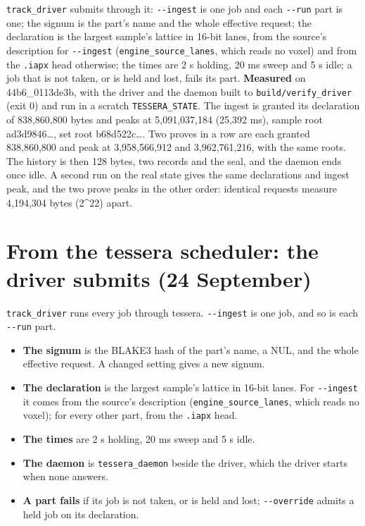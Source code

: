 \texttt{track\_\allowbreak{}driver} submits through it: \texttt{-\allowbreak{}-\allowbreak{}ingest} is one job and each \texttt{-\allowbreak{}-\allowbreak{}run} part is one; the signum is the part's name and the whole effective request; the declaration is the largest sample's lattice in 16-bit lanes, from the source's description for \texttt{-\allowbreak{}-\allowbreak{}ingest} (\texttt{engine\_\allowbreak{}source\_\allowbreak{}lanes}, which reads no voxel) and from the \texttt{.\allowbreak{}iapx} head otherwise; the times are 2 s holding, 20 ms sweep and 5 s idle; a job that is not taken, or is held and lost, fails its part. \textbf{Measured} on 44b6\_\allowbreak{}0113de3b, with the driver and the daemon built to \texttt{build/\allowbreak{}verify\_\allowbreak{}driver} (exit 0) and run in a scratch \texttt{TESSERA\_\allowbreak{}STATE}. The ingest is granted its declaration of 838,860,800 bytes and peaks at 5,091,037,184 (25,392 ms), sample root ad3d9846…, set root b68d522c…. Two proves in a row are each granted 838,860,800 and peak at 3,958,566,912 and 3,962,761,216, with the same roots. The history is then 128 bytes, two records and the seal, and the daemon ends once idle. A second run on the real state gives the same declarations and ingest peak, and the two prove peaks in the other order: identical requests measure 4,194,304 bytes (2\textasciicircum{}22) apart.

\section{\texorpdfstring{From the tessera scheduler: the driver submits (24 September)}{From the tessera scheduler: the driver submits (24 September)}}

\texttt{track\_\allowbreak{}driver} runs every job through tessera. \texttt{-\allowbreak{}-\allowbreak{}ingest} is one job, and so is each \texttt{-\allowbreak{}-\allowbreak{}run} part.

\begin{itemize}
\item \textbf{The signum} is the BLAKE3 hash of the part's name, a NUL, and the whole effective request. A changed setting gives a new signum.
\item \textbf{The declaration} is the largest sample's lattice in 16-bit lanes. For \texttt{-\allowbreak{}-\allowbreak{}ingest} it comes from the source's description (\texttt{engine\_\allowbreak{}source\_\allowbreak{}lanes}, which reads no voxel); for every other part, from the \texttt{.\allowbreak{}iapx} head.
\item \textbf{The times} are 2 s holding, 20 ms sweep and 5 s idle.
\item \textbf{The daemon} is \texttt{tessera\_\allowbreak{}daemon} beside the driver, which the driver starts when none answers.
\item \textbf{A part fails} if its job is not taken, or is held and lost; \texttt{-\allowbreak{}-\allowbreak{}override} admits a held job on its declaration.
\end{itemize}

